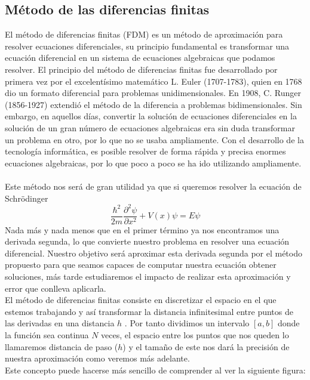 \documentclass{article}
\begin{document}
		\subsection{Método de las diferencias finitas}
		El método de diferencias finitas (FDM) es un método de aproximación para resolver ecuaciones diferenciales, su principio fundamental es transformar una ecuación diferencial en un sistema de ecuaciones algebraicas que podamos resolver. El principio del método de diferencias finitas fue desarrollado por primera vez por el excelentísimo matemático L. Euler (1707-1783), quien en 1768 dio un formato diferencial para problemas unidimensionales. En 1908, C. Runger (1856-1927) extendió el método de la diferencia a problemas bidimensionales. Sin embargo, en aquellos días, convertir la solución de ecuaciones diferenciales en la solución de un gran número de ecuaciones algebraicas era sin duda transformar un problema en otro, por lo que no se usaba ampliamente. Con el desarrollo de la tecnología informática, es posible resolver de forma rápida y precisa enormes ecuaciones algebraicas, por lo que poco a poco se ha ido utilizando ampliamente. 
		\\
		\\
		Este método nos será de gran utilidad ya que si queremos resolver la ecuación de Schrödinger
		\begin{equation}\label{eq2}
			\frac{\hbar^2}{2m} \frac{\partial^2\psi}{\partial x^2} + V(x)\psi = E \psi
		\end{equation}
		Nada más y nada menos que en el primer término ya nos encontramos una derivada segunda, lo que convierte nuestro problema en resolver una ecuación diferencial.
		Nuestro objetivo será aproximar esta derivada segunda  por el método propuesto para que seamos capaces de computar nuestra ecuación obtener soluciones,
		más tarde estudiaremos el impacto de realizar esta aproximación y error que conlleva aplicarla.\\
		
		El método de diferencias finitas consiste en discretizar el espacio en el que estemos trabajando 
		y así transformar la distancia infinitesimal entre puntos de las derivadas en una distancia $h$ 
		. Por tanto dividimos un intervalo $[a,b]$ donde la función sea continua $N$ veces,
		el espacio entre los puntos que nos queden lo llamaremos distancia de paso ($h$) y el tamaño de este nos dará la precisión de nuestra aproximación como veremos más adelante.\\
		 
		Este concepto puede hacerse más sencillo de comprender al ver la siguiente figura:
		
\end{document}
